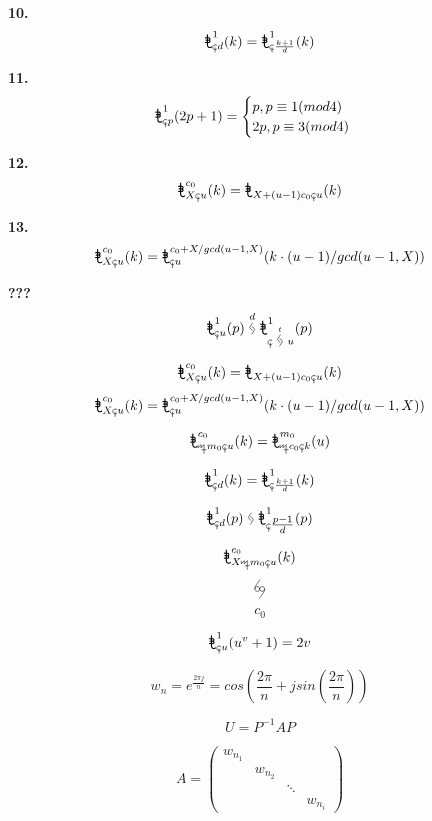 \documentclass[16pt]{article}
\newcommand{\mo}{
	\mathord{
		\tikz[scale=0.31,baseline=1.3pt]{
			\draw[thick]  (0,0.188)--(0,1.1);
			\draw[thick] (0,0.205)arc(180:318.2:0.203);
			\draw[thick] (-0.2,0.82)--(0.11,0.82);
			\draw[thick] (0.1,0.82)arc(90:-90:0.1);
			\draw[thick] (0.1,0.62)--(-0.15,0.62);
			\draw[thick] (0.1,0.62)arc(90:-90:0.1);
			\draw[thick] (0.11,0.42)--(-0.2,0.42);
		}
	}
}
\newcommand{\xm}{
	\mathord{
		\tikz[scale=0.25,baseline={(0,-0.03)}]{
			\draw (-0.3,0.3)--(-0.3,0);
			\draw (-0.3,0)--(0,0.3);
			\draw (0,0.3)--(0,0);
			\draw (0,0)--(0.3,0.3);
			\draw (0.3,0.3)--(0.3,-0.6);
			\draw (0.05,-0.2)--(0.55,-0.2);
			\fill (-0.3,0)circle(0.023);
			\fill (0,0.3)circle(0.023);
			\fill (0,0)circle(0.023);
			\fill (0.3,0.3)circle(0.023);
		}
	}
}
\newcommand{\xc}{
	\mathord{
		\tikz[scale=0.4,baseline={(0,0.06)}]{
			\draw (0.115,0.396)--(0,0.42);
			\draw (0,0.42)arc(90:325:0.15);
			\draw (0,0.26)--(0,-0.07);
			\fill (0,0.42)circle(0.017);
			
		}
	}
}
\newcommand{\he}{
	\ 
	\mathord{
		\tikz[scale=0.3, baseline={(0,-0.1)}]{
			\draw plot[smooth] coordinates{
				(0.05,0.5) (-0.2,0.07) (0.03,-0.15)
			};
			
			\draw plot[smooth] coordinates{
				(-0.05,-0.5) (0.2,-0.07) (-0.03,0.15)
			};
		}
	}
	\ 
}
\newcommand{\tanta}{
	\mathord{
		\tikz[scale=0.3, baseline={(0,-0.1)}]{
			\draw plot[smooth] coordinates{
				(-0.4,0) (-0.35,0.23) (0.03,0.8)
			};
			
			\draw plot[smooth] coordinates{
				(0.4,0) (0.35,-0.23) (-0.03,-0.8)
			};
			\draw (-0.2,0) circle [radius=0.2];
			\draw (0.2,0) circle [radius=0.2];
			
		}			
	}
}
\begin{document}
	\vspace{16pt}
	\textbf{10.}
	\vspace{-16pt}
	\[ \mo^1_{\xc d}(k) = \mo^1_{\xc \frac{k+1}{d}}(k) \]
	
	\vspace{16pt}
	\textbf{11.}
	\vspace{-16pt}
	\[ \mo^1_{\xc p}(2p+1) = \begin{cases}p, p \equiv 1 (mod 4) \\ 2p, p\equiv 3 (mod 4) \end{cases} \]
	
	\vspace{16pt}
	\textbf{12.}
	\vspace{-16pt}
	\[ \mo^{c_0}_{X \xc u}(k) = \mo_{X + (u-1)c_0 \xc u}(k) \]
	
	\vspace{16pt}
	\textbf{13.}
	\vspace{-16pt}
	\[ \mo^{c_0}_{X \xc u}(k) = \mo^{c_0 + X/gcd(u-1,X)}_{\xc u}(k\cdot(u-1)/gcd(u-1,X)) \]
	
	\vspace{4em}
	\textbf{???}
	\vspace{-16pt}
	\[ \mo^1_{\xc u}(p) \overset{d}{ \he} \mo^1_{\xc \overset{t}{\scriptstyle \he}u}(p) \]
	
	\[ \mo^{c_0}_{X \xc u}(k) = \mo_{X+(u-1)c_0 \xc u}(k) \]
	\vspace{1em}
	\[ \mo^{c_0}_{X \xc u}(k) = \mo^{c_0 + X / gcd(u-1,X)}_{\xc u}(k \cdot (u-1)/gcd(u-1,X))\]
	
	\vspace{1em}
	\[ \mo^{c_0}_{\xm m_0 \xc u}(k) = \mo^{m_0}_{\xm c_0 \xc k}(u)\]
	
	\vspace{1em}
	\[ \mo^{1}_{\xc d}(k) = \mo^{1}_{\xc \frac{k+1}{d}}(k) \]
	
	\vspace{1em}
	\[ \mo^1_{\xc d}(p) \he \mo^1_{\xc \tfrac{p-1}{d}}(p) \]
	
		\[ \mo^{c_0}_{X \xm m_0 \xc u}(k) \]
	\[ \tanta \]
	\[ c_0 \]
	
	\[ \mo^{1}_{\xc u}(u^v + 1)=2v \]
	
	\[ w_n = e^{\frac{2\pi j}{n}} = cos(\frac{2\pi}{n}+j sin(\frac{2\pi}{n})) \]
	
	\[ U=P^{-1}AP\]
	
	\[
	A = 
	\begin{pmatrix}
		w_{n_1} &        &        & 	   \\
		& w_{n_2} &        & 	   \\
		&        & \ddots &        \\
		&        &        & w_{n_i}
	\end{pmatrix}
	\]
	
\end{document}
